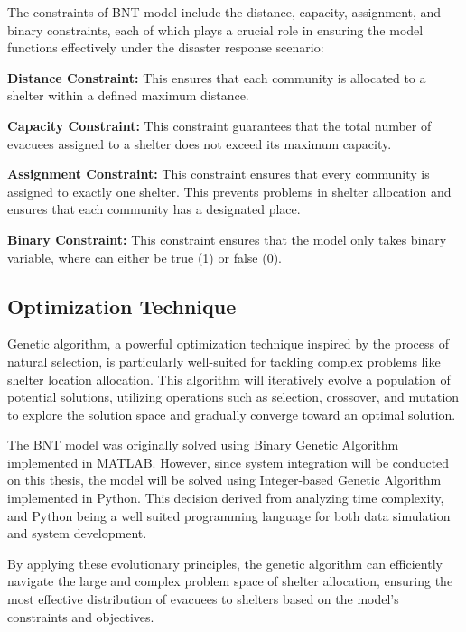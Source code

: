 	The constraints of BNT model include the distance, capacity, assignment, and binary constraints, each of which plays a crucial role in ensuring the model functions effectively under the disaster response scenario:
	
	\textbf{Distance Constraint: } This ensures that each community is allocated to a shelter within a defined maximum distance. 
	
	\textbf{Capacity Constraint: }This constraint guarantees that the total number of evacuees assigned to a shelter does not exceed its maximum capacity. 
	
	\textbf{Assignment Constraint: }This constraint ensures that every community is assigned to exactly one shelter. This prevents problems in shelter allocation and ensures that each community has a designated place.
	
	\textbf{Binary Constraint: } This constraint ensures that the model only takes binary variable, where can either be true (1) or false (0).
	
	\subsection{Optimization Technique}
	Genetic algorithm, a powerful optimization technique inspired by the process of natural selection, is particularly well-suited for tackling complex problems like shelter location allocation. This algorithm will iteratively evolve a population of potential solutions, utilizing operations such as selection, crossover, and mutation to explore the solution space and gradually converge toward an optimal solution.
	
	The BNT model was originally solved using Binary Genetic Algorithm implemented in MATLAB. However, since system integration will be conducted on this thesis, the model will be solved using Integer-based Genetic Algorithm implemented in Python. This decision derived from analyzing time complexity, and Python being a well suited programming language for both data simulation and system development.
	

	
	
	
	By applying these evolutionary principles, the genetic algorithm can efficiently navigate the large and complex problem space of shelter allocation, ensuring the most effective distribution of evacuees to shelters based on the model’s constraints and objectives.

